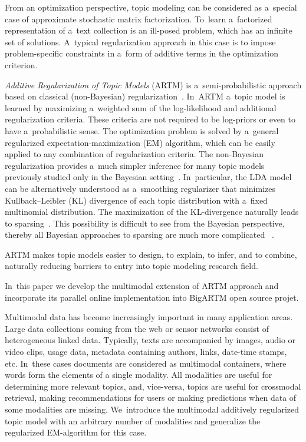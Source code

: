 \documentclass{acm_proc_article-sp}
\begin{document}
From an optimization perspective,
topic modeling can be considered as a~special case
of approximate stochastic matrix factorization.
To~learn a~factorized representation of a~text collection
is an ill-posed problem, which has an infinite set of solutions.
A~typical regularization approach in this case is
to impose problem-specific constraints
in a~form of additive terms in the optimization criterion.

\emph{Additive Regularization of Topic Models} (ARTM)
is a~semi-probabilistic approach based on classical (non-Bayesian) regularization~\cite{voron14dan-eng}.
In~ARTM a~topic model is learned by maximizing a~weighted sum
of the log-likelihood and additional regularization criteria.
These criteria are not required to be log-priors or even to have a~probabilistic sense.
The optimization problem is solved by a~general regularized expectation-maximization (EM) algorithm,
which can be easily applied to any combination of regularization criteria.
The non-Bayesian regularization provides a~much simpler inference
for many topic models previously studied only in the Bayesian setting~\cite{voron14aist,voron14mlj}.
In~particular,
the LDA model can be alternatively understood as a~smoothing regularizer
that minimizes Kullback--Leibler (KL) divergence
of each topic distribution with a~fixed multinomial distribution.
The maximization of the KL-divergence naturally leads to sparsing~\cite{voron14aist}.
This possibility is difficult to see from the Bayesian perspective,
thereby all Bayesian approaches to sparsing are much more complicated~%
\cite{shashanka07sparse,wang09decoupling,ugander11concave,eisenstein11sparse,chien13bayesian}.

ARTM makes topic models easier to design, to explain, to infer, and to combine,
naturally reducing barriers to entry into topic modeling research field.

In~this paper we develop the multimodal extension of ARTM approach
and incorporate its parallel online implementation into BigARTM open source projet.

Multimodal data has become increasingly important in many application areas.
Large data collections coming from the web or sensor networks
consist of heterogeneous linked data.
Typically, texts are accompanied by images, audio or video clips, usage data,
metadata containing authors, links, date-time stamps, etc.
In~these cases documents are considered as multimodal containers,
where words form the elements of a single modality.
All modalities are useful for determining more relevant topics,
and, vice-versa,
topics are useful for crossmodal retrieval,
making recommendations for users or
making predictions when data of some modalities are missing.
We~introduce the multimodal additively regularized topic model
with an arbitrary number of modalities
and generalize the regularized EM-algorithm for this case.
\end{document}
